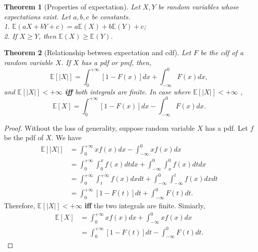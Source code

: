 \documentclass[11pt]{article}
\theoremstyle{plain}
\newtheorem{thm}{Theorem}[section]
\theoremstyle{definition}
\begin{document}
\begin{thm}[Properties of expectation]\label{thm:propexpect}
Let $X,Y$ be random variables whose expectations exist. Let $a,b,c$ be constants.\\
1. $\mathbb{E}(aX + bY + c) = a \mathbb{E}(X) + b \mathbb{E}(Y) + c$;\\
2. If $X \geq Y$, then $\mathbb{E} (X) \geq \mathbb{E} (Y) $.
\end{thm}

\begin{thm}[Relationship between expectation and cdf]\label{thm:expectcdf}
	Let $F$ be the cdf of a random variable $X$. If $X$ has a pdf or pmf, then,
	\[ \mathbb{E}[|X|] = \int_{0}^{+\infty} [1 - F(x)] dx + \int_{-\infty}^0 F(x) dx,  \]
	and $\mathbb{E}[|X|] < +\infty $ \textbf{iff} both integrals are finite. In case where $\mathbb{E}[|X|] < +\infty $ , 
	\[   \mathbb{E}[X] = \int_{0}^{+\infty} [1 - F(x)] dx - \int_{-\infty}^0 F(x) dx.  \]
\end{thm}
\begin{proof}
	Without the loss of generality, suppose random variable $X$ has a pdf. Let $f$ be the pdf of $X$. We have
	\begin{align}
		\mathbb{E}[|X|] &= \int_{0}^{+\infty} x f(x) dx - \int_{-\infty}^0 x f(x) dx\\
		&= \int_{0}^{+\infty} \int_{0}^{x}  f(x) dt dx + \int_{-\infty}^0 \int_{x}^0 f(x)dt dx \\
		&=  \int_{0}^{+\infty} \int_{t}^{+\infty}  f(x) dx dt + \int_{-\infty}^0 \int_{-\infty}^{t} f(x) dx dt\\
		&= \int_{0}^{+\infty} [1 - F(t)] dt + \int_{-\infty}^0 F(t) dt.
	\end{align}
		Therefore, $\mathbb{E}[|X|]< +\infty$ \textbf{iff} the two integrals are finite. Simiarly,
		\begin{align}
			\mathbb{E}[X] &= \int_{0}^{+\infty} x f(x) dx + \int_{-\infty}^0 x f(x) dx\\
		&= \int_{0}^{+\infty} [1 - F(t)] dt - \int_{-\infty}^0 F(t) dt.
		\end{align}
\end{proof}
\end{document}

